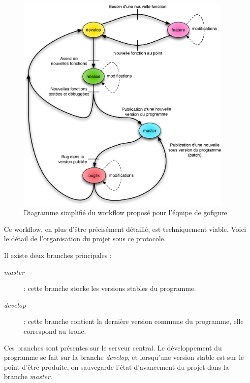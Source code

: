 \begin{figure}[h]
\begin{center}
\leavevmode
\includegraphics[width=0.95\textwidth]{pictures/Git_WorkflowSimple}
\end{center}
\caption{Diagramme simplifié du workflow proposé pour l'équipe de gofigure}
\label{fig:WorkflowGitSimple}
\end{figure}

Ce workflow, en plus d'être précisément détaillé, est techniquement viable. 
Voici le détail de l'organisation du projet {\gofigure} sous ce protocole.

Il existe deux branches principales : 
\begin{description}
  \item[\emph{master}] : cette branche stocke les versions stables du programme.
  \item[\emph{develop}] : cette branche contient la dernière version commune du programme, elle correspond au tronc.
\end{description}
Ces branches sont présentes sur le serveur central. Le développement du programme se fait sur la branche \emph{develop}, et lorsqu'une version stable est sur le point d'être produite, on sauvegarde l'état d'avancement du projet dans la branche \emph{master}.

